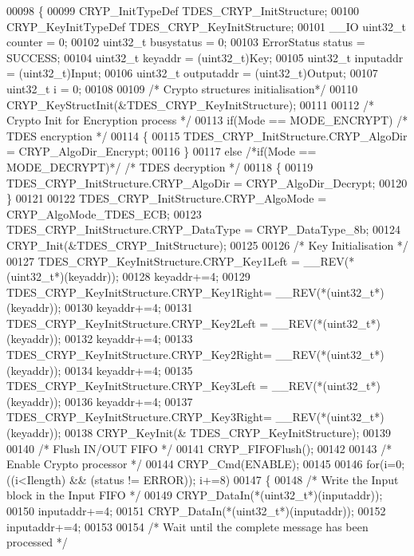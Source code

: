 \begin{DoxyCode}
00098 \{
00099   CRYP_InitTypeDef TDES\_CRYP\_InitStructure;
00100   CRYP_KeyInitTypeDef TDES\_CRYP\_KeyInitStructure;
00101   \_\_IO uint32\_t counter = 0;
00102   uint32\_t busystatus = 0;
00103   ErrorStatus status = SUCCESS;
00104   uint32\_t keyaddr    = (uint32\_t)Key;
00105   uint32\_t inputaddr  = (uint32\_t)Input;
00106   uint32\_t outputaddr = (uint32\_t)Output;
00107   uint32\_t i = 0;
00108 
00109   \textcolor{comment}{/* Crypto structures initialisation*/}
00110   CRYP_KeyStructInit(&TDES\_CRYP\_KeyInitStructure);
00111 
00112   \textcolor{comment}{/* Crypto Init for Encryption process */}
00113   \textcolor{keywordflow}{if}(Mode == MODE_ENCRYPT) \textcolor{comment}{/* TDES encryption */}
00114   \{
00115      TDES\_CRYP\_InitStructure.CRYP_AlgoDir = CRYP_AlgoDir_Encrypt;
00116   \}
00117   \textcolor{keywordflow}{else} \textcolor{comment}{/*if(Mode == MODE\_DECRYPT)*/} \textcolor{comment}{/* TDES decryption */}
00118   \{
00119      TDES\_CRYP\_InitStructure.CRYP_AlgoDir = CRYP_AlgoDir_Decrypt;
00120   \}
00121 
00122   TDES\_CRYP\_InitStructure.CRYP_AlgoMode = CRYP_AlgoMode_TDES_ECB;
00123   TDES\_CRYP\_InitStructure.CRYP_DataType = CRYP_DataType_8b;
00124   CRYP_Init(&TDES\_CRYP\_InitStructure);
00125 
00126   \textcolor{comment}{/* Key Initialisation */}
00127   TDES\_CRYP\_KeyInitStructure.CRYP_Key1Left = \_\_REV(*(uint32\_t*)(keyaddr));
00128   keyaddr+=4;
00129   TDES\_CRYP\_KeyInitStructure.CRYP_Key1Right= \_\_REV(*(uint32\_t*)(keyaddr));
00130   keyaddr+=4;
00131   TDES\_CRYP\_KeyInitStructure.CRYP_Key2Left = \_\_REV(*(uint32\_t*)(keyaddr));
00132   keyaddr+=4;
00133   TDES\_CRYP\_KeyInitStructure.CRYP_Key2Right= \_\_REV(*(uint32\_t*)(keyaddr));
00134   keyaddr+=4;
00135   TDES\_CRYP\_KeyInitStructure.CRYP_Key3Left = \_\_REV(*(uint32\_t*)(keyaddr));
00136   keyaddr+=4;
00137   TDES\_CRYP\_KeyInitStructure.CRYP_Key3Right= \_\_REV(*(uint32\_t*)(keyaddr));
00138   CRYP_KeyInit(& TDES\_CRYP\_KeyInitStructure);
00139 
00140   \textcolor{comment}{/* Flush IN/OUT FIFO */}
00141   CRYP_FIFOFlush();
00142 
00143   \textcolor{comment}{/* Enable Crypto processor */}
00144   CRYP_Cmd(ENABLE);
00145 
00146   \textcolor{keywordflow}{for}(i=0; ((i<Ilength) && (status != ERROR)); i+=8)
00147   \{
00148     \textcolor{comment}{/* Write the Input block in the Input FIFO */}
00149     CRYP_DataIn(*(uint32\_t*)(inputaddr));
00150     inputaddr+=4;
00151     CRYP_DataIn(*(uint32\_t*)(inputaddr));
00152     inputaddr+=4;
00153 
00154     \textcolor{comment}{/* Wait until the complete message has been processed */}

\end{DoxyCode}

